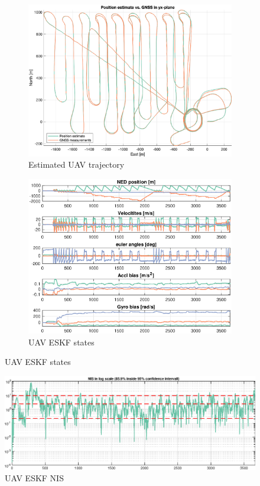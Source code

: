 \begin{figure}[ht]
    \centering
    \begin{subfigure}[b]{0.45\textwidth}
		\includegraphics[width=\textwidth]{figures/ga_2/real_trajectory.eps}
        \caption{Estimated UAV trajectory}
        \label{fig:ga_2_real_trajectory}
	\end{subfigure}%
    \begin{subfigure}[b]{0.45\textwidth}
		\includegraphics[width=\textwidth]{figures/ga_2/real_state.eps}
        \caption{UAV ESKF states}
        \label{fig:ga_2_real_state}
	\end{subfigure}
    \label{fig:ga_2_real_trajectory_state}
\end{figure}

\begin{figure}[!htb]
    \centering
    \includegraphics[width=0.8\linewidth]{figures/ga_2/real_consistency.eps}
    \caption{UAV ESKF NIS}
    \label{fig:ga_2_real_consistency}
\end{figure}